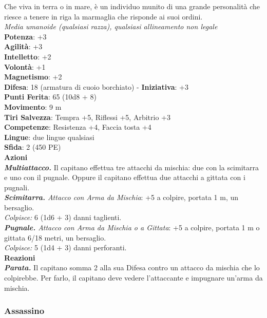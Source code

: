 \begin{multicols}{2}
Che viva in terra o in mare, è un individuo munito di una grande personalità che riesce a tenere in riga la marmaglia che risponde ai suoi ordini.\\
\emph{Media umanoide (qualsiasi razza), qualsiasi allineamento non legale}\\
\textbf{Potenza}: +3\\
\textbf{Agilità}: +3\\
\textbf{Intelletto}: +2\\
\textbf{Volontà}: +1\\
\textbf{Magnetismo}: +2\\
\textbf{Difesa}: 18 (armatura di cuoio borchiato) - \textbf{Iniziativa}: +3\\
\textbf{Punti Ferita}: 65 (10d8 + 8)\\
\textbf{Movimento}: 9 m\\
\textbf{Tiri Salvezza}: Tempra +5, Riflessi +5, Arbitrio +3 \\
\textbf{Competenze}: Resistenza +4, Faccia tosta +4\\
\textbf{Lingue}: due lingue qualsiasi\\
\textbf{Sfida}: 2 (450 PE)\smallskip\\
\smallskip\textbf{Azioni}\\
\emph{\textbf{Multiattacco.}} Il capitano effettua tre attacchi da mischia: due con la scimitarra e uno con il pugnale. Oppure il capitano effettua due attacchi a gittata con i pugnali.\\
\emph{\textbf{Scimitarra.} Attacco con Arma da Mischia}: +5 a colpire, portata 1 m, un bersaglio.\\
\emph{Colpisce:} 6 (1d6 + 3) danni taglienti.\\
\emph{\textbf{Pugnale.} Attacco con Arma da Mischia o a Gittata}: +5 a colpire, portata 1 m o gittata 6/18 metri, un bersaglio.\\
\emph{Colpisce:} 5 (1d4 + 3) danni perforanti.\\
\textbf{Reazioni}\\
\emph{\textbf{Parata.}} Il capitano somma 2 alla sua Difesa contro un attacco da mischia che lo colpirebbe. Per farlo, il capitano deve vedere l'attaccante e impugnare un'arma da mischia.

\subsubsection{Assassino}


\end{multicols}
